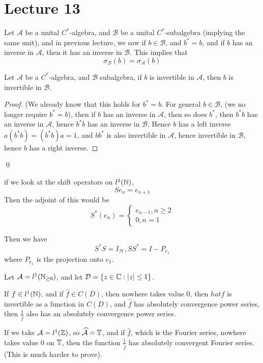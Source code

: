 \section{Lecture 13}
Let $\mathcal{A}$ be a unital $C^*$-algebra, and $\mathcal{B}$ be a unital $C^*$-subalgebra (implying the same unit), and in previous lecture, we saw if $b\in\mathcal{B}$, and $b^*=b$, and if $b$ has an inverse in $\mathcal{A}$, then it has an inverse in $\mathcal{B}$. 
This implies that
\begin{equation*}
    \sigma_\mathcal{B}(b)=\sigma_\mathcal{A}(b)
\end{equation*}



\begin{proposition}
    Let $\mathcal{A}$ be a $C^*$-algebra, and $\mathcal{B}$ subalgebra, if $b$ is invertible in $\mathcal{A}$, then $b$ is invertible in $\mathcal{B}$.
\end{proposition}
\begin{proof}
    (We already know that this holds for $b^*=b$. For general $b\in\mathcal{B}$, (we no longer require $b^*=b$), then if $b$ has an inverse in $\mathcal{A}$, then so does $b^*$, then $b^*b$ has an inverse in $\mathcal{A}$, hence $b^*b$ has an inverse in $\mathcal{B}$. Hence $b$ has a left inverse $a(b^*b)=(b^*b)a=1$, and $bb^*$ is also invertible in $\mathcal{A}$, hence invertible in $\mathcal{B}$, hence $b$ has a right inverse.
\end{proof}
\qed

if we look at the shift operators on $l^2(\mathbb{N})$, 
\begin{equation}
    Se_n=e_{n+1}
\end{equation}
Then the adjoint of this would be
\begin{equation*}
    S^*(e_n)=\begin{cases}
        e_{n-1}, n\geq 2\\
        0, n=1
    \end{cases}
\end{equation*}

Then we have
\begin{equation*}
    S^*S=I_\mathcal{H}, SS^*=I-P_{e_1}
\end{equation*}
where $P_{e_1}$ is the projection onto $e_1$.

Let $\mathcal{A}=l^1(\mathbb{N}_{\geq 0})$, and let $\mathcal{D}=\{z\in\mathbb{C}: |z|\leq 1\}$.
\begin{theorem}
    If $f\in l^1(\mathbb{N})$, and if $\hat{f}\in C(D)$, then nowhere takes value 0, then $hat{f}$ is invertible as a function in $C(D)$, and $\hat{f}$ has absolutely convergence power series, then $\frac{1}{\hat{f}}$ also has an absolutely convergence power series.
\end{theorem}
\begin{note}
    If we take $\mathcal{A}=l^1(\mathbb{Z})$, so $\widehat{\mathcal{A}}=\mathbb{T}$, and if $\hat{f}$, which is the Fourier series, nowhere takes value 0 on $\mathbb{T}$, then the function $\frac{1}{\hat{f}}$ has absolutely convergent Fourier series. (This is much harder to prove).
\end{note}

